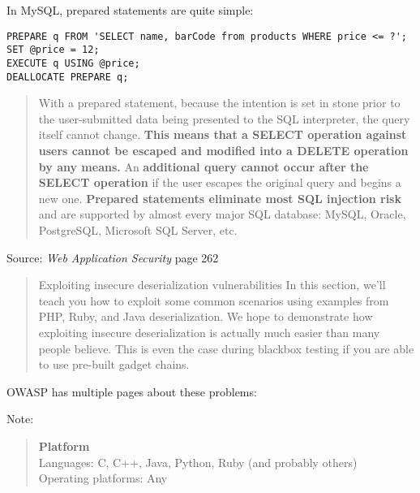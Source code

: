 \documentclass[Screen16to9,17pt]{foils}
\begin{document}

In MySQL, prepared statements are quite simple:
\begin{verbatim}
PREPARE q FROM 'SELECT name, barCode from products WHERE price <= ?';
SET @price = 12;
EXECUTE q USING @price;
DEALLOCATE PREPARE q;
\end{verbatim}

\begin{quote}
With a prepared statement, because the intention is set in stone prior to the user-submitted data being presented to the SQL interpreter, the query itself cannot change. {\bf This means that a SELECT operation against users cannot be escaped and modified into a DELETE operation by any means.} An {\bf additional query cannot occur after the SELECT operation} if the user escapes the original query and begins a new one. {\bf Prepared statements eliminate most SQL injection risk} and are supported by almost every major SQL database: MySQL, Oracle, PostgreSQL, Microsoft SQL Server, etc.
\end{quote}
Source: \emph{Web Application Security} page 262




\begin{quote}
Exploiting insecure deserialization vulnerabilities
In this section, we'll teach you how to exploit some common scenarios using examples from PHP, Ruby, and Java deserialization. We hope to demonstrate how exploiting insecure deserialization is actually much easier than many people believe. This is even the case during blackbox testing if you are able to use pre-built gadget chains.
\end{quote}



\begin{list2}
    \item OWASP has multiple pages about these problems:\\
\item Note:
\begin{quote}{\bf
Platform}\\
Languages: C, C++, Java, Python, Ruby (and probably others)\\
Operating platforms: Any
\end{quote}
\end{list2}
\end{document}

